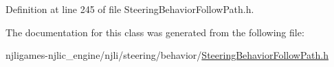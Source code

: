 Definition at line 245 of file Steering\+Behavior\+Follow\+Path.\+h.



The documentation for this class was generated from the following file\+:\begin{DoxyCompactItemize}
\item 
njligames-\/njlic\+\_\+engine/njli/steering/behavior/\mbox{\hyperlink{_steering_behavior_follow_path_8h}{Steering\+Behavior\+Follow\+Path.\+h}}\end{DoxyCompactItemize}
